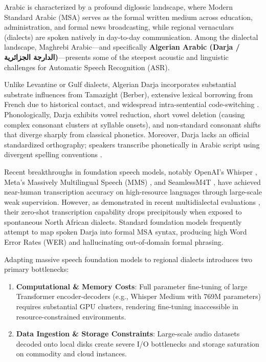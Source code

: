 \documentclass[11pt,a4paper]{article}
\providecommand{\textarabic}[1]{\foreignlanguage{arabic}{#1}}
\begin{document}
Arabic is characterized by a profound diglossic landscape, where Modern Standard Arabic (MSA) serves as the formal written medium across education, administration, and formal news broadcasting, while regional vernaculars (dialects) are spoken natively in day-to-day communication. Among the dialectal landscape, Maghrebi Arabic---and specifically \textbf{Algerian Arabic (Darja / \textarabic{الدارجة الجزائرية})}---presents some of the steepest acoustic and linguistic challenges for Automatic Speech Recognition (ASR). 

Unlike Levantine or Gulf dialects, Algerian Darja incorporates substantial substrate influences from Tamazight (Berber), extensive lexical borrowing from French due to historical contact, and widespread intra-sentential code-switching \cite{amazouz2018facst, lachemat2024cafe}. Phonologically, Darja exhibits vowel reduction, short vowel deletion (causing complex consonant clusters at syllable onsets), and non-standard consonant shifts that diverge sharply from classical phonetics. Moreover, Darja lacks an official standardized orthography; speakers transcribe phonetically in Arabic script using divergent spelling conventions \cite{abdaoui2021dziribert}.

Recent breakthroughs in foundation speech models, notably OpenAI's Whisper \cite{radford2022whisper}, Meta's Massively Multilingual Speech (MMS) \cite{pratap2023mms}, and SeamlessM4T \cite{barrault2023seamlessm4t}, have achieved near-human transcription accuracy on high-resource languages through large-scale weak supervision. However, as demonstrated in recent multidialectal evaluations \cite{talafha2024casablanca}, their zero-shot transcription capability drops precipitously when exposed to spontaneous North African dialects. Standard foundation models frequently attempt to map spoken Darja into formal MSA syntax, producing high Word Error Rates (WER) and hallucinating out-of-domain formal phrasing.

Adapting massive speech foundation models to regional dialects introduces two primary bottlenecks:
\begin{enumerate}[leftmargin=*]
    \item \textbf{Computational \& Memory Costs}: Full parameter fine-tuning of large Transformer encoder-decoders (e.g., Whisper Medium with 769M parameters) requires substantial GPU clusters, rendering fine-tuning inaccessible in resource-constrained environments.
    \item \textbf{Data Ingestion \& Storage Constraints}: Large-scale audio datasets decoded onto local disks create severe I/O bottlenecks and storage saturation on commodity and cloud instances.
\end{enumerate}
\end{document}
